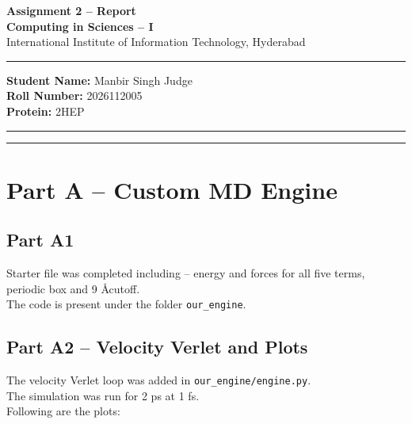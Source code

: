 \documentclass[11pt, a4paper]{article}
\begin{document}
\thispagestyle{no_hdr_border_rule}

\begin{center}
    {\Large \textbf{Assignment 2 -- Report}} \\[0.2cm]
    {\large \textbf{Computing in Sciences -- I}} \\[0.1cm]
    {\normalsize International Institute of Information Technology, Hyderabad} \\[0.3cm]
\end{center}

\vspace{0.2cm}
\hrule
\vspace{0.4cm}

\noindent \textbf{Student Name:} Manbir Singh Judge \\
\noindent \textbf{Roll Number:} 2026112005 \\
\noindent \textbf{Protein:} 2HEP \\

\hrule
\vspace{0.5cm}

\vspace{1em}

\tableofcontents
\vspace{0.5cm}
\hrule
\vspace{0.8cm}

\newpage
{}

\section{Part A -- Custom MD Engine}

\subsection{Part A1}
Starter file was completed including -- energy and forces for all five terms, periodic box and 9 \AA \space cutoff. \\
The code is present under the folder \verb|our_engine|.

\subsection{Part A2 -- Velocity Verlet and Plots}
The velocity Verlet loop was added in \verb|our_engine/engine.py|. \\
The simulation was run for 2 ps at 1 fs. \\
Following are the plots: 
\end{document}

